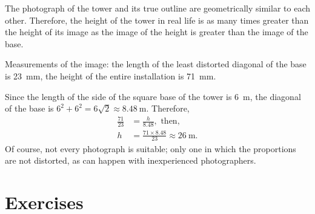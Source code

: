 \ans The photograph of the tower and its true outline are geometrically similar to each other. Therefore, the height of the tower in real life is as many times greater than the height of its image as the image of the height is greater than the image of the base.

Measurements of the image: the length of the least distorted diagonal of the base is \SI{23}{\milli\meter}, the height of the entire installation is \SI{71}{\milli\meter}.

Since the length of the side of the square base of the tower is \SI{6}{\meter}, the diagonal of the base is $6^{2} + 6^{2} = 6\sqrt{2} \approx \SI{8.48}{\meter}$. Therefore, 
\begin{align*}%
\frac{71}{23} & = \frac{h}{8.48},\,\, \text{then,	}\\
h & = \frac{71 \times 8.48}{23} \approx \SI{26}{\meter}.
\end{align*}
Of course, not every photograph is suitable; only one in which the proportions are not distorted, as can happen with inexperienced photographers.


\section{Exercises}

